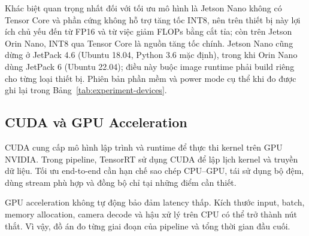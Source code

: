 Khác biệt quan trọng nhất đối với tối ưu mô hình là Jetson Nano không có Tensor
Core và phần cứng không hỗ trợ tăng tốc INT8, nên trên thiết bị này lợi ích chủ
yếu đến từ FP16 và từ việc giảm FLOPs bằng cắt tỉa; còn trên Jetson Orin Nano,
INT8 qua Tensor Core là nguồn tăng tốc chính. Jetson Nano cũng dừng ở JetPack 4.6
(Ubuntu 18.04, Python 3.6 mặc định), trong khi Orin Nano dùng JetPack 6
(Ubuntu 22.04); điều này buộc image runtime phải build riêng cho từng loại thiết bị.
Phiên bản phần mềm và power mode cụ thể khi đo được ghi lại trong
Bảng~\ref{tab:experiment-devices}.

\subsection{CUDA và GPU Acceleration}

CUDA cung cấp mô hình lập trình và runtime để thực thi kernel trên GPU NVIDIA.
Trong pipeline, TensorRT sử dụng CUDA để lập lịch kernel và truyền dữ liệu. Tối
ưu end-to-end cần hạn chế sao chép CPU--GPU, tái sử dụng bộ đệm, dùng stream
phù hợp và đồng bộ chỉ tại những điểm cần thiết.

GPU acceleration không tự động bảo đảm latency thấp. Kích thước input, batch,
memory allocation, camera decode và hậu xử lý trên CPU có thể trở thành nút thắt.
Vì vậy, đồ án đo từng giai đoạn của pipeline và tổng thời gian đầu cuối.